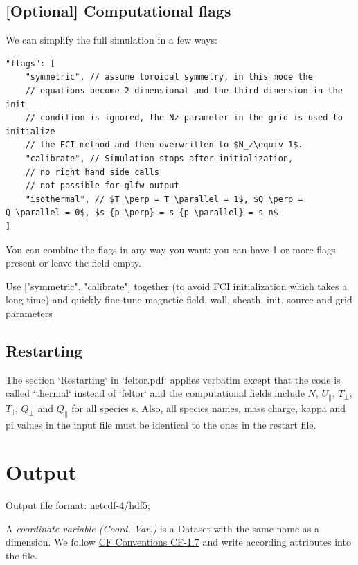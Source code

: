 \subsection{[Optional] Computational flags}
We can simplify the full simulation in a few ways:
\begin{verbatim}
"flags": [
    "symmetric", // assume toroidal symmetry, in this mode the
    // equations become 2 dimensional and the third dimension in the init
    // condition is ignored, the Nz parameter in the grid is used to initialize
    // the FCI method and then overwritten to $N_z\equiv 1$.
    "calibrate", // Simulation stops after initialization,
    // no right hand side calls
    // not possible for glfw output
    "isothermal", // $T_\perp = T_\parallel = 1$, $Q_\perp = Q_\parallel = 0$, $s_{p_\perp} = s_{p_\parallel} = s_n$
]
\end{verbatim}
You can combine the flags in any way you want: you can have 1 or more
flags present or leave the field empty.
\begin{tcolorbox}[title=Note]
    Use ["symmetric", "calibrate"] together (to avoid FCI initialization
    which takes a long time) and quickly fine-tune
    magnetic field, wall, sheath, init, source and grid parameters
\end{tcolorbox}
\subsection{Restarting} \label{sec:restart}
The section `Restarting` in `feltor.pdf` applies verbatim except that the code is called `thermal` instead of `feltor` and the computational fields include
$N$, $U_\parallel$, $T_\perp$, $T_\parallel$, $Q_\perp$ and $Q_\parallel$ for all species s.
Also, all species names, mass charge, kappa and pi values in the input file must be identical to the ones in the restart file.

\section{Output} \label{sec:output_file}
Output file format: \href{https://www.unidata.ucar.edu/software/netcdf/docs/}{netcdf-4/hdf5};

A \textit{coordinate variable (Coord. Var.)} is a Dataset with the same name as a dimension.
We follow
\href{http://cfconventions.org/Data/cf-conventions/cf-conventions-1.7/cf-conventions.html}{CF Conventions CF-1.7}
and write according attributes into the file.


